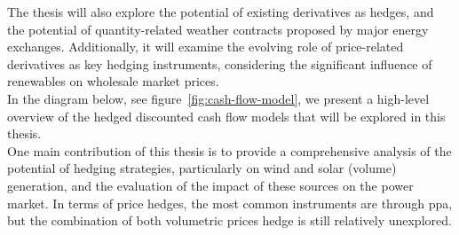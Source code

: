     The thesis will also explore the potential of existing derivatives as hedges,
    and the potential of quantity-related weather contracts proposed by major energy exchanges.
    Additionally, it will examine the evolving role of price-related derivatives as key hedging instruments,
    considering the significant influence of renewables on wholesale market prices.\\

    In the diagram below, see figure~\ref{fig:cash-flow-model}, we present a high-level overview of the hedged discounted
    cash flow models that will be explored in this thesis.\\

    One main contribution of this thesis is to provide a comprehensive analysis of the potential of hedging strategies,
    particularly on wind and solar (volume) generation, and the evaluation of the impact of these sources on the power market.
    In terms of price hedges, the most common instruments are through \gls{ppa}, but the combination of both volumetric
    prices hedge is still relatively unexplored.\\


